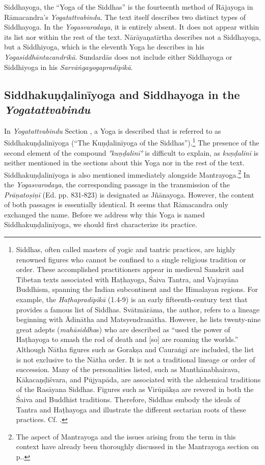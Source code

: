 Siddhayoga, the ``Yoga of the Siddhas'' is the fourteenth method of Rājayoga in Rāmacandra's \textit{Yogatattvabindu}. The text itself describes two distinct types of Siddhayoga. In the \textit{Yogasvarodaya}, it is entirely absent. It does not appear within its list nor within the rest of the text. Nārāyaṇatīrtha describes not a Siddhayoga, but a Siddhiyoga, which is the eleventh Yoga he describes in his \textit{Yogasiddhāntacandrikā}. Sundardās does not include either Siddhayoga or Siddhiyoga in his \textit{Sarvāṅgayogapradīpikā}.

\subsection{Siddhakuṇḍalinīyoga and Siddhayoga in the \textit{Yogatattvabindu}} 

In \textit{Yogatattvabindu} Section , a Yoga is described that is referred to as Siddhakuṇḍalinīyoga (``The Kuṇḍalinīyoga of the Siddhas'').\footnote{Siddhas, often called masters of yogic and tantric practices, are highly renowned figures who cannot be confined to a single religious tradition or order. These accomplished practitioners appear in medieval Sanskrit and Tibetan texts associated with Haṭhayoga, Śaiva Tantra, and Vajrayāna Buddhism, spanning the Indian subcontinent and the Himalayan regions. For example, the \emph{Haṭhapradīpikā} (1.4-9) is an early fifteenth-century text that provides a famous list of Siddhas. Svātmārāma, the author, refers to a lineage beginning with Ādinātha and Matsyendranātha. However, he lists twenty-nine great adepts (\textit{mahāsiddha}s) who are described as ``used the power of Haṭhayoga to smash the rod of death and [so] are roaming the worlds.'' Although Nātha figures such as Gorakṣa and Cauraṅgī are included, the list is not exclusive to the Nātha order. It is not a traditional lineage or order of succession. Many of the personalities listed, such as Manthānabhairava, Kākacaṇḍīśvara, and Pūjyapāda, are associated with the alchemical traditions of the Rasāyana Siddhas. Figures such as Virūpākṣa are revered in both the Śaiva and Buddhist traditions. Therefore, Siddhas embody the ideals of Tantra and Haṭhayoga and illustrate the different sectarian roots of these practices. Cf. \citeauthor[2023: 35-36]{powell2023}.} The presence of the second element of the compound \textit{°kuṇḍalinī°} is difficult to explain, as \textit{kuṇḍalinī} is neither mentioned in the sections about this Yoga nor in the rest of the text. Siddhakuṇḍalinīyoga is also mentioned immediately alongside Mantrayoga.\footnote{The aspect of Mantrayoga and the issues arising from the term in this context have already been thoroughly discussed in the Mantrayoga section on p.\pageref{bindumantra}.} In the \textit{Yogasvarodaya}, the corresponding passage in the transmission of the \textit{Prāṇatoṣiṇī} (Ed. pp. 831-823) is designated as Jñānayoga. However, the content of both passages is essentially identical. It seems that Rāmacandra only exchanged the name. Before we address why this Yoga is named Siddhakuṇḍalinīyoga, we should first characterize its practice.

